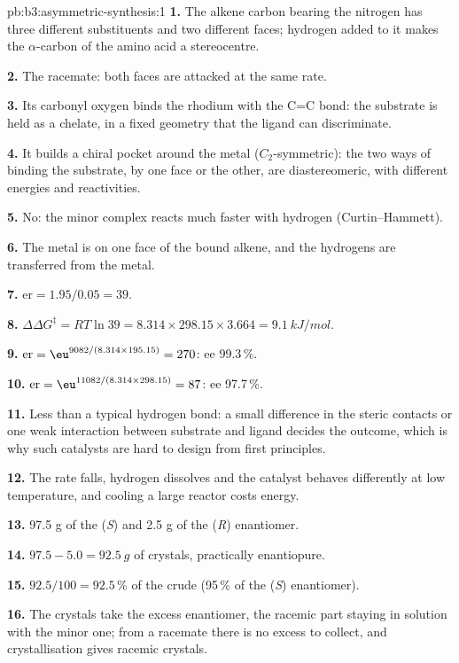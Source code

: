 \begin{solution}{pb:b3:asymmetric-synthesis:1}
\textbf{1.} The alkene carbon bearing the nitrogen has three different substituents
and two different faces; hydrogen added to it makes the $\alpha$-carbon of the amino
acid a stereocentre.

\textbf{2.} The racemate: both faces are attacked at the same rate.

\textbf{3.} Its carbonyl oxygen binds the rhodium with the C=C bond: the substrate is
held as a chelate, in a fixed geometry that the ligand can discriminate.

\textbf{4.} It builds a chiral pocket around the metal ($C_2$-symmetric): the two ways of
binding the substrate, by one face or the other, are diastereomeric, with different
energies and reactivities.

\textbf{5.} No: the minor complex reacts much faster with hydrogen (Curtin--Hammett).

\textbf{6.} The metal is on one face of the bound alkene, and the hydrogens are
transferred from the metal.

\textbf{7.} $\mathrm{er} = 1.95/0.05 = 39$.

\textbf{8.} $\Delta\Delta G^\ddagger = RT\ln 39 = 8.314 \times 298.15 \times 3.664 = \qty{9.1}{kJ/mol}$.

\textbf{9.} $\mathrm{er} = \eu^{9082/(8.314 \times 195.15)} = 270$: ee 99.3\,\%.

\textbf{10.} $\mathrm{er} = \eu^{11082/(8.314 \times 298.15)} = 87$: ee 97.7\,\%.

\textbf{11.} Less than a typical hydrogen bond: a small difference in the steric
contacts or one weak interaction between substrate and ligand decides the
outcome, which is why such catalysts are hard to design from first principles.

\textbf{12.} The rate falls, hydrogen dissolves and the catalyst behaves differently
at low temperature, and cooling a large reactor costs energy.

\textbf{13.} 97.5 g of the (\textit{S}) and 2.5 g of the (\textit{R}) enantiomer.

\textbf{14.} $97.5 - 5.0 = \qty{92.5}{g}$ of crystals, practically enantiopure.

\textbf{15.} $92.5/100 = 92.5$\,\% of the crude (95\,\% of the (\textit{S}) enantiomer).

\textbf{16.} The crystals take the excess enantiomer, the racemic part staying in
solution with the minor one; from a racemate there is no excess to collect, and
crystallisation gives racemic crystals.


\end{solution}
